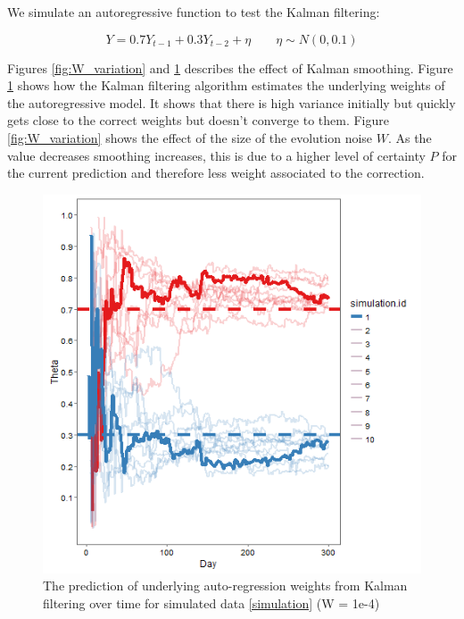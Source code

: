 \documentclass{sig-alternate-05-2015}
\begin{document}
We simulate an autoregressive function to test the Kalman filtering: 

\begin{equation}
 Y = 0.7Y_{t-1} + 0.3Y_{t-2} + \eta \qquad \eta \sim N(0,0.1) \label{simulation}
\end{equation}

Figures \ref{fig:W_variation} and \ref{fig:Weight_Estimation} describes the effect of Kalman smoothing. Figure \ref{fig:Weight_Estimation} shows how the Kalman filtering algorithm estimates the underlying weights of the autoregressive model. It shows that there is high variance initially but quickly gets close to the correct weights but doesn't converge to them. Figure \ref{fig:W_variation} shows the effect of the size of the evolution noise $W$. As the value decreases smoothing increases, this is due to a higher level of certainty $P$ for the current prediction and therefore less weight associated to the correction. 

\begin{figure}[ht]
	\includegraphics[width=\linewidth]{Test_Weight_Estimation.png}
	\centering
	\caption{The prediction of underlying auto-regression weights from Kalman filtering over time for simulated data \eqref{simulation} (W = 1e-4)}
			\label{fig:Weight_Estimation}
\end{figure}
\end{document}
